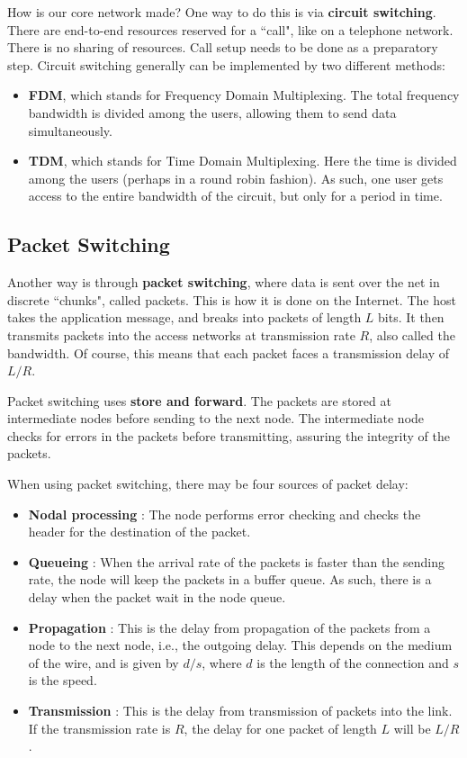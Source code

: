 \documentclass[12pt,letterpaper]{amsbook}
\theoremstyle{definition}
\begin{document}
How is our core network made? One way to do this is via \textbf{circuit switching}. There are end-to-end resources reserved for a ``call", like on a telephone network. There is no sharing of resources. Call setup needs to be done as a preparatory step. Circuit switching generally can be implemented by two different methods:

\begin{itemize}
  \item \textbf{FDM}, which stands for Frequency Domain Multiplexing. The total frequency bandwidth is divided among the users, allowing them to send data simultaneously. 
  \item \textbf{TDM}, which stands for Time Domain Multiplexing. Here the time is divided among the users (perhaps in a round robin fashion). As such, one user gets access to the entire bandwidth of the circuit, but only for a period in time.
\end{itemize}

\subsection{Packet Switching}

Another way is through \textbf{packet switching}, where data is sent over the net in discrete ``chunks", called packets. This is how it is done on the Internet. The host takes the application message, and breaks into packets of length $L$ bits. It then transmits packets into the access networks at transmission rate $R$, also called the bandwidth. Of course, this means that each packet faces a transmission delay of $L/R$.

Packet switching uses \textbf{store and forward}. The packets are stored at intermediate nodes before sending to the next node. The intermediate node checks for errors in the packets before transmitting, assuring the integrity of the packets.

When using packet switching, there may be four sources of packet delay:

\begin{itemize}
  \item \textbf{Nodal processing} : The node performs error checking and checks the header for the destination of the packet.
  \item \textbf{Queueing} : When the arrival rate of the packets is faster than the sending rate, the node will keep the packets in a buffer queue. As such, there is a delay when the packet wait in the node queue.
  \item \textbf{Propagation} : This is the delay from propagation of the packets from a node to the next node, i.e., the outgoing delay. This depends on the medium of the wire, and is given by $d/s$, where $d$ is the length of the connection and $s$ is the speed.
  \item \textbf{Transmission} : This is the delay from transmission of packets into the link. If the transmission rate is $R$, the delay for one packet of length $L$ will be $L/R$.
\end{itemize}
\end{document}
